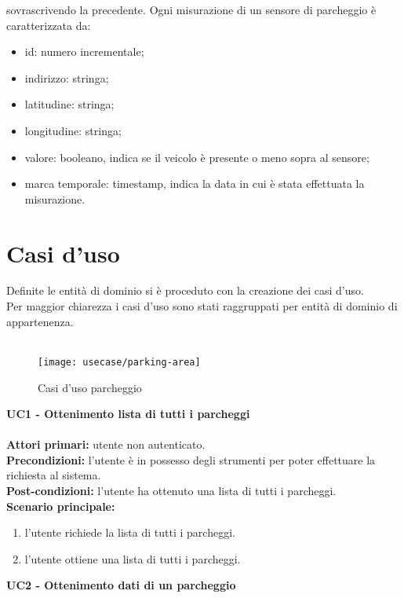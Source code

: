 sovrascrivendo la precedente.
Ogni misurazione di un sensore di parcheggio è caratterizzata da:
\begin{itemize}
    \item id: numero incrementale;
    \item indirizzo: stringa;
    \item latitudine: stringa;
    \item longitudine: stringa;
    \item valore: booleano, indica se il veicolo è presente o meno sopra al sensore;
    \item marca temporale: timestamp, indica la data in cui è stata effettuata la misurazione.
\end{itemize}

\section{Casi d'uso}
Definite le entità di dominio si è proceduto con la creazione dei casi d'uso.
\\
Per maggior chiarezza i casi d'uso sono stati raggruppati per entità di dominio di appartenenza.
\\\\
\begin{figure}[H]
    \centering
    \texttt{[image: usecase/parking-area]}
    \caption{Casi d'uso parcheggio}
\end{figure}
\leavevmode\newline
\textbf{UC1 - Ottenimento lista di tutti i parcheggi}
\\\\
\textbf{Attori primari:} utente non autenticato.
\\
\textbf{Precondizioni:} l'utente è in possesso degli strumenti per poter effettuare la richiesta al sistema.
\\
\textbf{Post-condizioni:} l'utente ha ottenuto una lista di tutti i parcheggi.
\\
\textbf{Scenario principale:}
\begin{enumerate}
    \item l'utente richiede la lista di tutti i parcheggi.
    \item l'utente ottiene una lista di tutti i parcheggi.
\end{enumerate}
\leavevmode\newline
\textbf{UC2 - Ottenimento dati di un parcheggio}
\\\\
